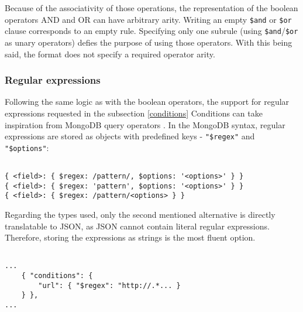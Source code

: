 Because of the associativity of those operations, the representation of the boolean operators AND and OR can have arbitrary arity.
Writing an empty \texttt{\$and} or \texttt{\$or} clause corresponds to an empty rule. 
Specifying only one subrule (using \texttt{\$and}/\texttt{\$or} as unary operators) defies the purpose of using those operators. 
With this being said, the format does not specify a required operator arity. 

\subsubsection{Regular expressions}

Following the same logic as with the boolean operators, the support for regular expressions requested in the subsection \ref{conditions} Conditions can take inspiration from MongoDB query operators .
In the MongoDB syntax, regular expressions are stored as objects with predefined keys - \texttt{"\$regex"} and \texttt{"\$options"}:

\begin{minipage}{0.95\linewidth}
    \begin{verbatim}
    
{ <field>: { $regex: /pattern/, $options: '<options>' } }
{ <field>: { $regex: 'pattern', $options: '<options>' } }
{ <field>: { $regex: /pattern/<options> } }
    \end{verbatim}
\end{minipage}

Regarding the types used, only the second mentioned alternative is directly translatable to JSON, as JSON cannot contain literal regular expressions. 
Therefore, storing the expressions as strings is the most fluent option.

\begin{minipage}{0.95\linewidth}
    \begin{verbatim}
        
...
    { "conditions": {
        "url": { "$regex": "http://.*... }
    } },
...
    \end{verbatim}
\end{minipage}
    